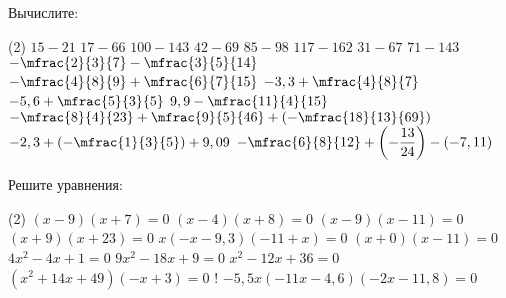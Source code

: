 \begin{class}[number=3]
	\begin{listofex}
		\item Вычислите:
		\begin{tasks}(2)
			\task \( 15-21 \)
			\task \( 17-66 \)
			\task \( 100-143 \)
			\task \( 42-69 \)
			\task \( 85-98 \)
			\task \( 117-162 \)
			\task \( 31-67 \)
			\task \( 71-143 \)
			\task \( -\mfrac{2}{3}{7}-\mfrac{3}{5}{14} \)
			\task \( -\mfrac{4}{8}{9}+\mfrac{6}{7}{15} \)
			\task \( -3,3+\mfrac{4}{8}{7} \)
			\task \( -5,6+\mfrac{5}{3}{5} \)
			\task \( 9,9-\mfrac{11}{4}{15} \)
			\task \( -\mfrac{8}{4}{23}+\mfrac{9}{5}{46}+\left(-\mfrac{18}{13}{69}\right) \)
			\task \( -2,3 + \left(-\mfrac{1}{3}{5}\right) + 9,09 \)
			\task \( -\mfrac{6}{8}{12} + \left(-\dfrac{13}{24}\right) - (-7,11) \)
		\end{tasks}
		\item Решите уравнения: %
		\begin{tasks}(2)
			\task \( (x-9)(x+7)=0 \)
			\task \( (x-4)(x+8)=0 \)
			\task \( (x-9)(x-11)=0 \)
			\task \( (x+9)(x+23)=0 \)
			\task \( x(-x-9,3)(-11+x)=0 \)
			\task \( (x+0)(x-11)=0 \)
			\task \( 4x^2-4x+1=0 \)
			\task \( 9x^2-18x+9=0 \)
			\task \( x^2-12x+36=0 \)
			\task \( (x^2+14x+49)(-x+3)=0 \)
			\task! \( -5,5x(-11x-4,6)(-2x-11,8)=0 \)
		\end{tasks}
		
	\end{listofex}
\end{class}

